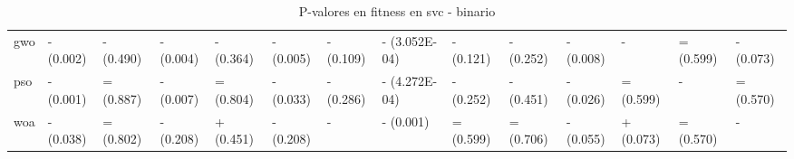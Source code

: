 \begin{sidewaystable}[htp]
\begin{adjustbox}{width=\linewidth}
\begin{tabular}{llllllllllllll}
            gwo   & - (0.002) & - (0.490) & - (0.004) & - (0.364) & - (0.005) & - (0.109) & - (3.052E-04) & - (0.121) & - (0.252) & - (0.008) & -             & = (0.599)     & - (0.073) \\
            pso   & - (0.001) & = (0.887) & - (0.007) & = (0.804) & - (0.033) & - (0.286) & - (4.272E-04) & - (0.252) & - (0.451) & - (0.026) & = (0.599)     & -             & = (0.570) \\
            woa   & - (0.038) & = (0.802) & - (0.208) & + (0.451) & - (0.208) & -         & - (0.001)     & = (0.599) & = (0.706) & - (0.055) & + (0.073)     & = (0.570)     & -         \\
            \bottomrule
        \end{tabular}
    \end{adjustbox}
    \caption{P-valores en fitness en svc - binario}
\end{sidewaystable}



